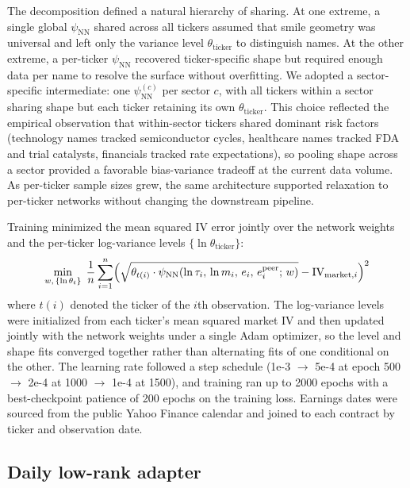 The decomposition defined a natural hierarchy of sharing. At one extreme, a single global $\psi_{\text{NN}}$ shared across all tickers assumed that smile geometry was universal and left only the variance level $\theta_{\text{ticker}}$ to distinguish names. At the other extreme, a per-ticker $\psi_{\text{NN}}$ recovered ticker-specific shape but required enough data per name to resolve the surface without overfitting. We adopted a sector-specific intermediate: one $\psi_{\text{NN}}^{(c)}$ per sector $c$, with all tickers within a sector sharing shape but each ticker retaining its own $\theta_{\text{ticker}}$. This choice reflected the empirical observation that within-sector tickers shared dominant risk factors (technology names tracked semiconductor cycles, healthcare names tracked FDA and trial catalysts, financials tracked rate expectations), so pooling shape across a sector provided a favorable bias-variance tradeoff at the current data volume. As per-ticker sample sizes grew, the same architecture supported relaxation to per-ticker networks without changing the downstream pipeline.

Training minimized the mean squared IV error jointly over the network weights and the per-ticker log-variance levels $\{\ln\theta_{\text{ticker}}\}$:
\begin{equation}\label{eq:nn_loss}
    \min_{w,\,\{\ln\theta_t\}} \;\frac{1}{n} \sum_{i=1}^{n} \Bigl(\sqrt{\theta_{t(i)} \cdot \psi_{\text{NN}}(\ln\tau_i,\,\ln m_i,\,e_i,\,e^{\text{peer}}_i;\,w)} - \text{IV}_{\text{market},i}\Bigr)^2
\end{equation}
where $t(i)$ denoted the ticker of the $i$th observation. The log-variance levels were initialized from each ticker's mean squared market IV and then updated jointly with the network weights under a single Adam optimizer, so the level and shape fits converged together rather than alternating fits of one conditional on the other. The learning rate followed a step schedule (1\mbox{e-3} $\to$ 5\mbox{e-4} at epoch 500 $\to$ 2\mbox{e-4} at 1000 $\to$ 1\mbox{e-4} at 1500), and training ran up to 2000 epochs with a best-checkpoint patience of 200 epochs on the training loss. Earnings dates were sourced from the public Yahoo Finance calendar and joined to each contract by ticker and observation date.

\subsection{Daily low-rank adapter}\label{sec:lora_method}

